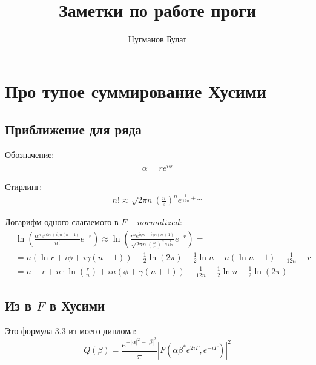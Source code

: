 \documentclass[a4paper, 12pt]{article}
\title{Заметки по работе проги}
\author{Нугманов Булат}
\begin{document}
\maketitle
\section{Про тупое суммирование Хусими}
\subsection*{Приближение для ряда}
Обозначение:
\begin{equation}
\begin{aligned}
    \alpha = r e^{i\phi}
\end{aligned}
\end{equation}

Стирлинг:
\begin{equation}
\begin{aligned}
    n! \approx \sqrt{2\pi n} \left(\frac{n}{e}\right)^n e^{\frac{1}{12n}+\dots}
\end{aligned}
\end{equation}

Логарифм одного слагаемого в $F-normalized$:
\begin{equation}
\begin{aligned}
    &\ln\left(\frac{\alpha^n e^{i\phi n + i\gamma n(n+1)}}{n!}e^{-r}\right)  \approx 
    \ln\left(\frac{r^n e^{i\phi n + i\gamma n(n+1)}}{\sqrt{2\pi n} \left(\frac{n}{e}\right)^n e^{\frac{1}{12n}}}e^{-r}\right) =\\
    &=n \left(\ln r + i \phi + i \gamma (n+1)\right) - \frac{1}{2}\ln\left(2\pi\right) 
    - \frac{1}{2}\ln n - n \left(\ln n - 1\right) - \frac{1}{12n} - r\\
    &=n-r + n\cdot\ln\left(\frac{r}{n}\right) + i n \left(\phi + \gamma(n+1)\right)
     -  \frac{1}{12n} - \frac{1}{2}\ln n - \frac{1}{2}\ln\left(2\pi\right) 
\end{aligned}
\end{equation}

\subsection*{Из в $F$ в Хусими}
Это формула 3.3 из моего диплома:
\begin{equation}\label{QsimF}
	Q(\beta) =
	\frac{e^{-|\alpha|^2 -|\beta|^2}}{\pi} \left|F(\alpha \beta^* e^{2 i \Gamma}, e^{-i \Gamma} )\right|^2
\end{equation}
\end{document}
